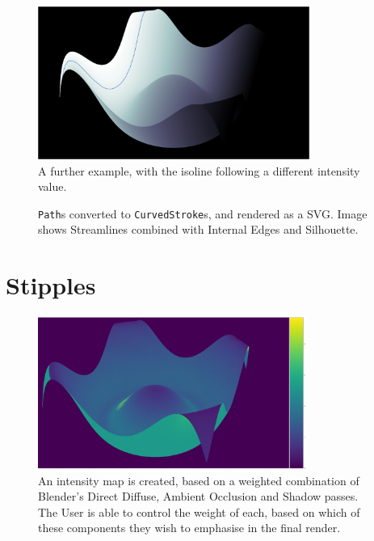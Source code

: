 \begin{figure}[h!]
	\centering
	\includegraphics[height=5cm]{images/stream_cont2.png}
	\caption{A further example, with the isoline following a different intensity value.}\label{stream_cont1}
\end{figure}

\begin{figure}[h!]
	\centering
	
	\caption{\texttt{Path}s converted to \texttt{CurvedStroke}s, and rendered as a SVG. Image shows Streamlines combined with Internal Edges and Silhouette.}\label{stream}
\end{figure}

\FloatBarrier
\section{Stipples}
\begin{figure}[h!]
	\centering
	\includegraphics[height=5cm]{images/stipple_intensity.png}
	\caption{An intensity map is created, based on a weighted combination of Blender's Direct Diffuse, Ambient Occlusion and Shadow passes. The User is able to control the weight of each, based on which of these components they wish to emphasise in the final render.}\label{stipple_intensity}
\end{figure}

